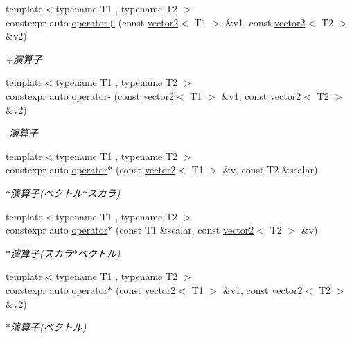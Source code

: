 \begin{DoxyCompactItemize}
{\footnotesize template$<$typename T1 , typename T2 $>$ }\\constexpr auto \mbox{\hyperlink{namespacesaki_a7c132b30fc5554123e166c29a5292607}{operator+}} (const \mbox{\hyperlink{classsaki_1_1vector2}{vector2}}$<$ T1 $>$ \&v1, const \mbox{\hyperlink{classsaki_1_1vector2}{vector2}}$<$ T2 $>$ \&v2)
\begin{DoxyCompactList}\small\item\em +演算子 \end{DoxyCompactList}\item 
{\footnotesize template$<$typename T1 , typename T2 $>$ }\\constexpr auto \mbox{\hyperlink{namespacesaki_ab08546185e6a03ba6496daf21d943799}{operator-\/}} (const \mbox{\hyperlink{classsaki_1_1vector2}{vector2}}$<$ T1 $>$ \&v1, const \mbox{\hyperlink{classsaki_1_1vector2}{vector2}}$<$ T2 $>$ \&v2)
\begin{DoxyCompactList}\small\item\em -\/演算子 \end{DoxyCompactList}\item 
{\footnotesize template$<$typename T1 , typename T2 $>$ }\\constexpr auto \mbox{\hyperlink{namespacesaki_af6d6668922b972ec01303867612e4783}{operator$\ast$}} (const \mbox{\hyperlink{classsaki_1_1vector2}{vector2}}$<$ T1 $>$ \&v, const T2 \&scalar)
\begin{DoxyCompactList}\small\item\em $\ast$演算子(ベクトル$\ast$スカラ) \end{DoxyCompactList}\item 
{\footnotesize template$<$typename T1 , typename T2 $>$ }\\constexpr auto \mbox{\hyperlink{namespacesaki_a7d5d04727e813b089aadf4b97247b64a}{operator$\ast$}} (const T1 \&scalar, const \mbox{\hyperlink{classsaki_1_1vector2}{vector2}}$<$ T2 $>$ \&v)
\begin{DoxyCompactList}\small\item\em $\ast$演算子(スカラ$\ast$ベクトル) \end{DoxyCompactList}\item 
{\footnotesize template$<$typename T1 , typename T2 $>$ }\\constexpr auto \mbox{\hyperlink{namespacesaki_a1db47b2e2e0826325ae66ee6216ba5fc}{operator$\ast$}} (const \mbox{\hyperlink{classsaki_1_1vector2}{vector2}}$<$ T1 $>$ \&v1, const \mbox{\hyperlink{classsaki_1_1vector2}{vector2}}$<$ T2 $>$ \&v2)
\begin{DoxyCompactList}\small\item\em $\ast$演算子(ベクトル) \end{DoxyCompactList}\item 

\end{DoxyCompactItemize}
